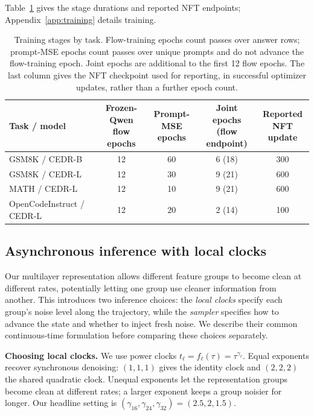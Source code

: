 \documentclass[11pt,letterpaper]{article}
\begin{document}
Table~\ref{tab:trainingstages} gives the stage durations and reported NFT endpoints; Appendix~\ref{app:training} details training.

\begin{table}[!htb]
\centering\small
\setlength{\tabcolsep}{5pt}
\caption{Training stages by task. Flow-training epochs count passes over answer rows; prompt-MSE epochs count passes over unique prompts and do not advance the flow-training epoch. Joint epochs are additional to the first 12 flow epochs. The last column gives the NFT checkpoint used for reporting, in successful optimizer updates, rather than a further epoch count.}
\label{tab:trainingstages}
\begin{tabular}{@{}lcccc@{}}
\toprule
Task / model & \shortstack{Frozen-Qwen\\flow epochs} & \shortstack{Prompt-MSE\\epochs} & \shortstack{Joint epochs\\(flow endpoint)} & \shortstack{Reported\\NFT update}\\
\midrule
GSM8K / CEDR-B & 12 & 60 & 6 (18) & 300\\
GSM8K / CEDR-L & 12 & 30 & 9 (21) & 600\\
MATH / CEDR-L & 12 & 10 & 9 (21) & 600\\
OpenCodeInstruct / CEDR-L & 12 & 20 & 2 (14) & 100\\
\bottomrule
\end{tabular}
\end{table}

\subsection{Asynchronous inference with local clocks}
\label{sec:clocks}

Our multilayer representation allows different feature groups to become clean at different rates, potentially letting one group use cleaner information from another. This introduces two inference choices: the \emph{local clocks} specify each group's noise level along the trajectory, while the \emph{sampler} specifies how to advance the state and whether to inject fresh noise. We describe their common continuous-time formulation before comparing these choices separately.

\textbf{Choosing local clocks.}
We use power clocks $t_\ell=f_\ell(\tau)=\tau^{\gamma_\ell}$. Equal exponents recover synchronous denoising: $(1,1,1)$ gives the identity clock and $(2,2,2)$ the shared quadratic clock. Unequal exponents let the representation groups become clean at different rates; a larger exponent keeps a group noisier for longer. Our headline setting is $(\gamma_{16},\gamma_{24},\gamma_{32})=(2.5,2,1.5)$.
\end{document}
